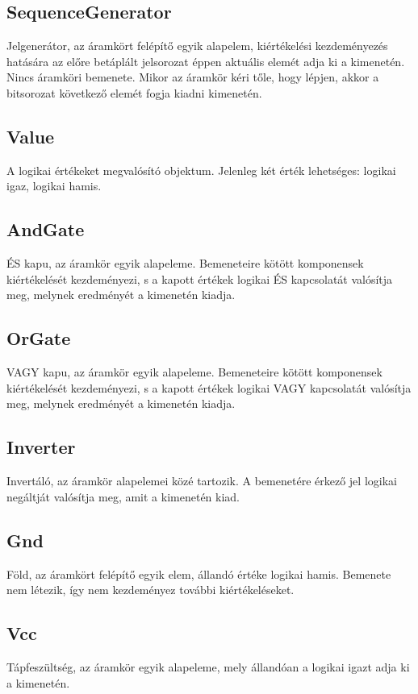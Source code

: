 \subsection{\bf SequenceGenerator}
Jelgenerátor, az áramkört felépítő egyik alapelem, kiértékelési kezdeményezés hatására az előre betáplált jelsorozat éppen aktuális elemét adja ki a kimenetén. Nincs áramköri bemenete. Mikor az áramkör kéri tőle, hogy lépjen, akkor a bitsorozat következő elemét fogja kiadni kimenetén.

\subsection{\bf Value}
A logikai értékeket megvalósító objektum. Jelenleg két érték lehetséges: logikai igaz, logikai hamis.

\subsection{\bf AndGate}
ÉS kapu, az áramkör egyik alapeleme. Bemeneteire kötött komponensek kiértékelését kezdeményezi, s a kapott értékek logikai ÉS kapcsolatát valósítja meg, melynek eredményét a kimenetén kiadja.

\subsection{\bf OrGate}
VAGY kapu, az áramkör egyik alapeleme. Bemeneteire kötött komponensek kiértékelését kezdeményezi, s a kapott értékek logikai VAGY kapcsolatát valósítja meg, melynek eredményét a kimenetén kiadja.

\subsection{\bf Inverter}
Invertáló, az áramkör alapelemei közé tartozik. A bemenetére érkező jel logikai negáltját valósítja meg, amit a kimenetén kiad.

\subsection{\bf Gnd}
Föld, az áramkört felépítő egyik elem, állandó értéke logikai hamis. Bemenete nem létezik, így nem kezdeményez további kiértékeléseket.

\subsection{\bf Vcc}
Tápfeszültség, az áramkör egyik alapeleme, mely állandóan a logikai igazt adja ki a kimenetén.

